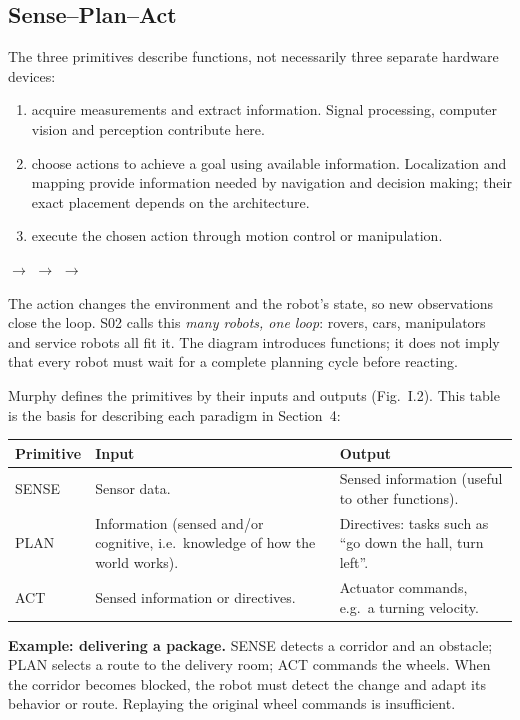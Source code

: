 \subsection{Sense--Plan--Act}
The three primitives describe functions, not necessarily three separate hardware devices:
\begin{enumerate}
\item {} acquire measurements and extract information. Signal processing, computer vision and perception contribute here.
\item {} choose actions to achieve a goal using available information. Localization and mapping provide information needed by navigation and decision making; their exact placement depends on the architecture.
\item {} execute the chosen action through motion control or manipulation.
\end{enumerate}
\begin{center}
 $\longrightarrow$  $\longrightarrow$  $\longrightarrow$ 
\end{center}
The action changes the environment and the robot's state, so new observations close the loop. S02 calls this \emph{many robots, one loop}: rovers, cars, manipulators and service robots all fit it. The diagram introduces functions; it does not imply that every robot must wait for a complete planning cycle before reacting.

Murphy defines the primitives by their inputs and outputs (Fig.~I.2). This table is the basis for describing each paradigm in Section~4:
\par\smallskip\begin{tabularx}{\linewidth}{@{}L{20mm}YY@{}}
\toprule
Primitive & Input & Output \\
\midrule
SENSE & Sensor data. & Sensed information (useful to other functions). \\
PLAN & Information (sensed and/or cognitive, i.e.\ knowledge of how the world works). & Directives: tasks such as ``go down the hall, turn left''. \\
ACT & Sensed information or directives. & Actuator commands, e.g.\ a turning velocity. \\
\bottomrule
\end{tabularx}\par\smallskip

\textbf{Example: delivering a package.} SENSE detects a corridor and an obstacle; PLAN selects a route to the delivery room; ACT commands the wheels. When the corridor becomes blocked, the robot must detect the change and adapt its behavior or route. Replaying the original wheel commands is insufficient.

